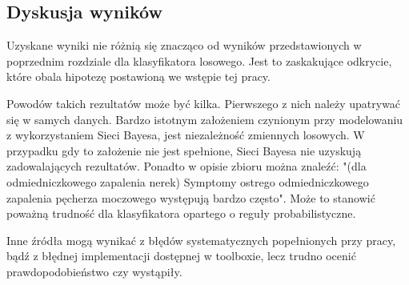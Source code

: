 \documentclass[12pt]{article}
\begin{document}
\subsection{Dyskusja wyników}

Uzyskane wyniki nie różnią się znacząco od wyników przedstawionych w poprzednim rozdziale dla klasyfikatora losowego. Jest to zaskakujące odkrycie, które obala hipotezę postawioną we wstępie tej pracy. 

Powodów takich rezultatów może być kilka. Pierwszego z nich należy upatrywać się w samych danych. Bardzo istotnym założeniem czynionym przy modelowaniu z wykorzystaniem Sieci Bayesa, jest niezależność zmiennych losowych. W przypadku gdy to założenie nie jest spełnione, Sieci Bayesa nie uzyskują zadowalających rezultatów. Ponadto w opisie zbioru można znaleźć: "(dla odmiedniczkowego zapalenia nerek) Symptomy ostrego odmiedniczkowego zapalenia pęcherza moczowego występują bardzo często". Może to stanowić poważną trudność dla klasyfikatora opartego o reguły probabilistyczne. 

Inne źródła mogą wynikać z błędów systematycznych popełnionych przy pracy, bądź z błędnej implementacji dostępnej w toolboxie, lecz trudno ocenić prawdopodobieństwo czy wystąpiły.
\end{document}
